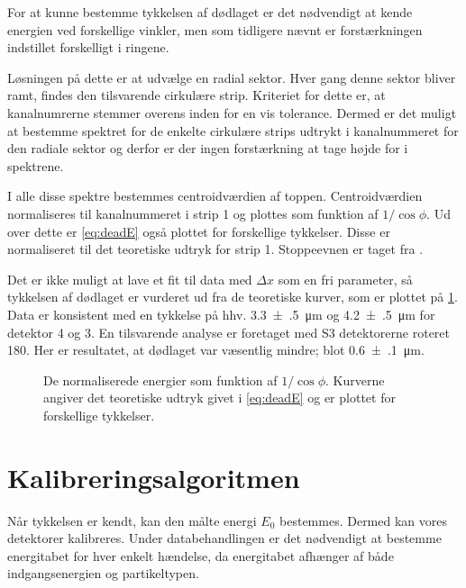 For at kunne bestemme tykkelsen af dødlaget er det nødvendigt at kende energien ved forskellige
vinkler, men som tidligere nævnt er forstærkningen indstillet forskelligt i ringene.

Løsningen på dette er at udvælge en radial sektor. Hver gang denne sektor bliver ramt, findes den
tilsvarende cirkulære strip. Kriteriet for dette er, at kanalnumrerne stemmer overens inden for en
vis tolerance. Dermed er det muligt at bestemme spektret for de enkelte cirkulære strips udtrykt i
kanalnummeret for den radiale sektor og derfor er der ingen forstærkning at tage højde for i
spektrene.

I alle disse spektre bestemmes centroidværdien af \Pu toppen.  Centroidværdien normaliseres til
kanalnummeret i strip 1 og plottes som funktion af $1/{\cos \phi}$. Ud over dette er
\cref{eq:deadE} også plottet for forskellige tykkelser. Disse er normaliseret til det teoretiske
udtryk for strip 1. Stoppeevnen er taget fra \cite{Ziegler}.

Det er ikke muligt at lave et fit til data med $\Delta x$ som en fri parameter, så tykkelsen af
dødlaget er vurderet ud fra de teoretiske kurver, som er plottet på \cref{fig:dead}. Data er
konsistent med en tykkelse på hhv. \SI{3.3(5)}{\um} og \SI{4.2(5)}{\um} for detektor 4 og 3. En
tilsvarende analyse er foretaget med S3 detektorerne roteret 180\degree. Her er resultatet, at
dødlaget var væsentlig mindre; blot \SI{0.6(1)}{\um}. 

\begin{figure}[h]
  \centering
  \hfill
  \caption{De normaliserede energier som funktion af $1/{\cos\phi}$. Kurverne angiver det teoretiske
    udtryk givet i \cref{eq:deadE} og er plottet for forskellige tykkelser.}
  \label{fig:dead}
\end{figure}

\vspace{-5mm}
\section{Kalibreringsalgoritmen}
\label{sec:kalalgo}

Når tykkelsen er kendt, kan den målte energi $E_{0}$ bestemmes. Dermed kan vores detektorer
kalibreres. Under databehandlingen er det nødvendigt at bestemme energitabet for hver enkelt
hændelse, da energitabet afhænger af både indgangsenergien og partikeltypen.

